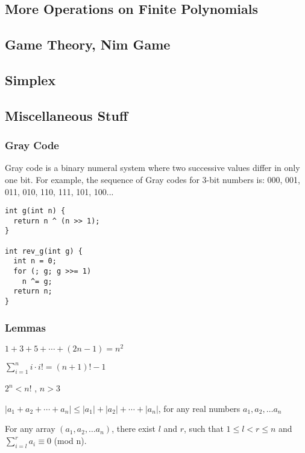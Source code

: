 \subsection{More Operations on Finite Polynomials}
\subsection{Game Theory, Nim Game}
\subsection{Simplex}

\newpage

\subsection{Miscellaneous Stuff}

\subsubsection{Gray Code}

Gray code is a binary numeral system where two successive values differ in only one bit. \cite{GrayCode_CPAlgo}
For example, the sequence of Gray codes for 3-bit numbers is: 000, 001, 011, 010, 110, 111, 101, 100...

\begin{lstlisting}
int g(int n) {
  return n ^ (n >> 1);
}

int rev_g(int g) {
  int n = 0;
  for (; g; g >>= 1)
    n ^= g;
  return n;
}
\end{lstlisting}

\subsubsection{Lemmas}

\begin{lemma}
$1 + 3 + 5 + \cdots + (2n - 1) = n^2$
\end{lemma}

\begin{lemma}
$\displaystyle \sum_{i=1}^{n} i \cdot i! = (n + 1)! - 1$
\end{lemma}

\begin{lemma}
  $2^n < n!$ , $n > 3$
\end{lemma}

\begin{lemma}
  $|a_1+a_2+\cdots+a_n| \leq |a_1| + |a_2| + \cdots + |a_n|$, for any real numbers $a_1, a_2, \dots a_n$
\end{lemma}

\begin{lemma}
  For any array $(a_1, a_2, \dots a_n)$, there exist $l$ and $r$, such that $1 \leq l < r \leq n$ and \\ $\displaystyle \sum_{i=l}^{r} a_i \equiv 0$ (mod n).
\end{lemma}
